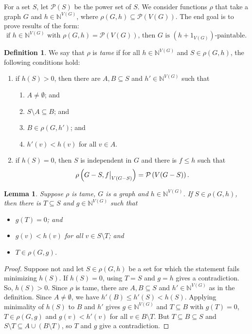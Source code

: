 \documentclass[12pt]{article}
\theoremstyle{plain}
\newtheorem{lem}[thm]{Lemma}
\theoremstyle{definition}
\newtheorem{defn}{Definition}
\theoremstyle{remark}
\newcommand{\IN}{\mathbb{N}}
\newcommand{\parens}[1]{\left( #1 \right)}
\newcommand\restr[2]{{%
  \left.\kern-\nulldelimiterspace %
  #1 %
  \vphantom{\big|} %
  \right|_{#2} %
  }}
\newcommand{\powset}[1]{\mathcal{P}\parens{#1}}
\begin{document}
For a set $S$, let $\powset{S}$ be the power set of $S$. We consider functions $\rho$ that take a graph $G$ and $h \in \IN^{V(G)}$, where $\rho(G,h) \subseteq \powset{V(G)}$.  The end goal is to prove results of the form:
\[\text{if } h \in \IN^{V(G)} \text{ with } \rho(G, h) = \powset{V(G)}\text{, then } G \text{ is } (h + 1_{V(G)})\text{-paintable}.\]
\newpage
\begin{defn}\label{tame}
	We say that $\rho$ is \emph{tame} if for all $h \in \IN^{V(G)}$ and $S \in \rho(G, h)$, the following conditions hold:
\begin{enumerate}
	\item if $h(S) > 0$, then there are $A, B \subseteq S$ and $h' \in \IN^{V(G)}$ such that
	\begin{enumerate}
	\item $A \neq \emptyset$; and
	\item $S \setminus A \subseteq B$; and
	\item $B \in \rho(G, h')$; and
	\item $h'(v) < h(v)$ for all $v \in A$.
	\end{enumerate}
	\item if $h(S) = 0$, then $S$ is independent in $G$ and there is $f \le h$ such that 
	\[\rho\parens{G - S, \restr{f}{V(G-S)}} = \powset{V(G-S)}.\]
\end{enumerate}
\end{defn}

\begin{lem}\label{GetSuperStable}
	Suppose $\rho$ is tame, $G$ is a graph and $h \in \IN^{V(G)}$.  If $S \in \rho(G, h)$, then there is $T \subseteq S$ and $g \in \IN^{V(G)}$ such that
	\begin{itemize}
		\item $g(T) = 0$; and
		\item $g(v) < h(v)$ for all $v \in S\setminus T$; and
		\item $T \in \rho(G, g)$.
	\end{itemize}
\end{lem}
\begin{proof}
Suppose not and let $S \in \rho(G, h)$ be a set for which the statement fails minimizing $h(S)$. If $h(S) = 0$, using $T = S$ and $g = h$ gives a contradiction.
So, $h(S) > 0$. Since $\rho$ is tame, there are $A, B \subseteq S$ and $h' \in \IN^{V(G)}$ as in the definition.
Since $A \ne \emptyset$, we have $h'(B) \le h'(S) < h(S)$.  Applying minimality of $h(S)$ to $B$ and $h'$ gives $g \in \IN^{V(G)}$ and $T \subseteq B$ with $g(T) = 0$, 
$T \in \rho(G, g)$ and $g(v) < h'(v)$ for all $v \in B \setminus T$.   But $T \subseteq B \subseteq S$ and $S\setminus T \subseteq A \cup \parens{B \setminus T}$,
so $T$ and $g$ give a contradiction.

\end{proof}
\end{document}
